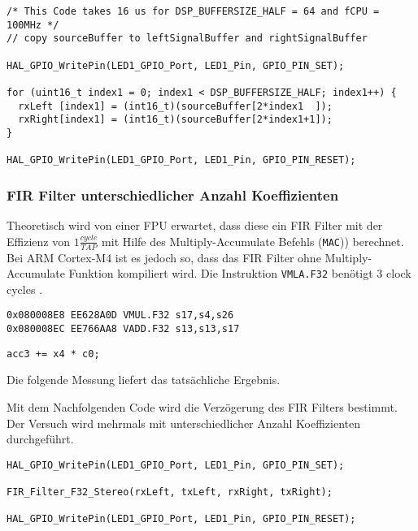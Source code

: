 \begin{lstlisting}[style=Cuvision, caption={GPIO togglen um die Kopierzeit zu messen}]
/* This Code takes 16 us for DSP_BUFFERSIZE_HALF = 64 and fCPU = 100MHz */
// copy sourceBuffer to leftSignalBuffer and rightSignalBuffer

HAL_GPIO_WritePin(LED1_GPIO_Port, LED1_Pin, GPIO_PIN_SET);

for (uint16_t index1 = 0; index1 < DSP_BUFFERSIZE_HALF; index1++) {
  rxLeft [index1] = (int16_t)(sourceBuffer[2*index1  ]);  
  rxRight[index1] = (int16_t)(sourceBuffer[2*index1+1]); 
}

HAL_GPIO_WritePin(LED1_GPIO_Port, LED1_Pin, GPIO_PIN_RESET);
\end{lstlisting}


\subsubsection{FIR Filter unterschiedlicher Anzahl Koeffizienten}

Theoretisch wird von einer FPU erwartet, dass diese ein FIR Filter mit der Effizienz von $1\frac{cycle}{TAP}$ mit Hilfe des Multiply-Accumulate Befehls (\texttt{MAC})) berechnet.
Bei ARM Cortex-M4 ist es jedoch so, dass das FIR Filter ohne Multiply-Accumulate Funktion kompiliert wird. Die Instruktion \texttt{VMLA.F32} benötigt 3 clock cycles \cite{ARM-M4-FPU-reference}. \\

\begin{lstlisting}[style=Cuvision,caption={Kompilierte Multiply-Accumulate Instruktion}]
0x080008E8 EE628A0D VMUL.F32 s17,s4,s26
0x080008EC EE766AA8 VADD.F32 s13,s13,s17
\end{lstlisting}

\begin{lstlisting}[style=Cuvision,caption={Multiply-Accumulate Befehl in C aus der CMSIS/DSP Library \texttt{arm\_fir\_f32.c}}, firstnumber=465]
    acc3 += x4 * c0;
\end{lstlisting}

Die folgende Messung liefert das tatsächliche Ergebnis.

Mit dem Nachfolgenden Code wird die Verzögerung des FIR Filters bestimmt.
Der Versuch wird mehrmals mit unterschiedlicher Anzahl Koeffizienten durchgeführt.\\

\begin{lstlisting}[style=Cuvision,caption={GPIO togglen um FIR Verarbeitungszeit zu messen}]
HAL_GPIO_WritePin(LED1_GPIO_Port, LED1_Pin, GPIO_PIN_SET);

FIR_Filter_F32_Stereo(rxLeft, txLeft, rxRight, txRight);

HAL_GPIO_WritePin(LED1_GPIO_Port, LED1_Pin, GPIO_PIN_RESET);
\end{lstlisting}



